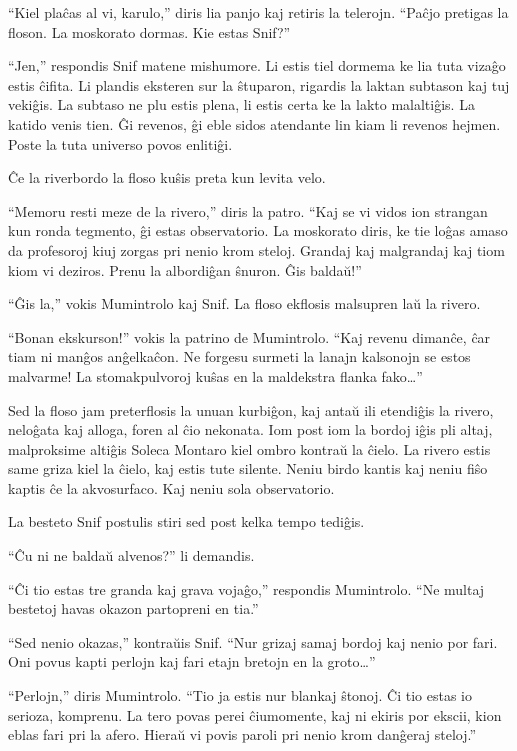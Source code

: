 ``Kiel plaĉas al vi, karulo,'' diris lia panjo kaj retiris la telerojn. ``Paĉjo pretigas la floson. La moskorato dormas. Kie estas Snif?''

``Jen,'' respondis Snif matene mishumore. Li estis tiel dormema ke lia tuta vizaĝo estis ĉifita. Li plandis eksteren sur la ŝtuparon, rigardis la laktan subtason kaj tuj vekiĝis. La subtaso ne plu estis plena, li estis certa ke la lakto malaltiĝis. La katido venis tien. Ĝi revenos, ĝi eble sidos atendante lin kiam li revenos hejmen. Poste la tuta universo povos enlitiĝi.

Ĉe la riverbordo la floso kuŝis preta kun levita velo.

``Memoru resti meze de la rivero,'' diris la patro. ``Kaj se vi vidos ion strangan kun ronda tegmento, ĝi estas observatorio. La moskorato diris, ke tie loĝas amaso da profesoroj kiuj zorgas pri nenio krom steloj. Grandaj kaj malgrandaj kaj tiom kiom vi deziros. Prenu la albordiĝan ŝnuron. Ĝis baldaŭ!''

``Ĝis la,'' vokis Mumintrolo kaj Snif. La floso ekflosis malsupren laŭ la rivero.

``Bonan ekskurson!'' vokis la patrino de Mumintrolo. ``Kaj revenu dimanĉe, ĉar tiam ni manĝos anĝelkaĉon. Ne forgesu surmeti la lanajn kalsonojn se estos malvarme! La stomakpulvoroj kuŝas en la maldekstra flanka fako{\ldots}''

Sed la floso jam preterflosis la unuan kurbiĝon, kaj antaŭ ili etendiĝis la rivero, neloĝata kaj alloga, foren al ĉio nekonata.
\sectionbreak
Iom post iom la bordoj iĝis pli altaj, malproksime altiĝis Soleca Montaro kiel ombro kontraŭ la ĉielo. La rivero estis same griza kiel la ĉielo, kaj estis tute silente. Neniu birdo kantis kaj neniu fiŝo kaptis ĉe la akvosurfaco. Kaj neniu sola observatorio.

La besteto Snif postulis stiri sed post kelka tempo tediĝis.

``Ĉu ni ne baldaŭ alvenos?'' li demandis.

``Ĉi tio estas tre granda kaj grava vojaĝo,'' respondis Mumintrolo. ``Ne multaj bestetoj havas okazon partopreni en tia.''

``Sed nenio okazas,'' kontraŭis Snif. ``Nur grizaj samaj bordoj kaj nenio por fari. Oni povus kapti perlojn kaj fari etajn bretojn en la groto{\ldots}''

``Perlojn,'' diris Mumintrolo. ``Tio ja estis nur blankaj ŝtonoj. Ĉi tio estas io serioza, komprenu. La tero povas perei ĉiumomente, kaj ni ekiris por ekscii, kion eblas fari pri la afero. Hieraŭ vi povis paroli pri nenio krom danĝeraj steloj.''

